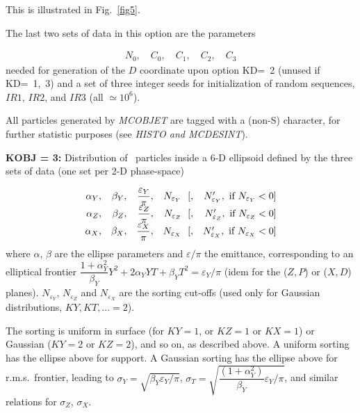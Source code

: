 \noindent This is illustrated in Fig.~\ref{fig5}.

\medskip

\noindent The last two sets of data in this option are the parameters 

 \begin{gather*}
	N_0,\quad C_0,\quad C_1,\quad C_2,\quad C_3 
 \end{gather*}
%
 needed for generation of the $ D $ coordinate upon option \mbox{KD=  2}  
(unused if \mbox{KD= 1, 3}) and a set of three integer seeds for initialization 
of random sequences, $ IR1$,   $ IR2$,   and $ IR3$ (all $\simeq 10^6 $).


\noindent All particles generated by \textsl{MCOBJET}  are tagged with
a (non-S) character, for further statistic purposes (see \textsl{HISTO \textrm{and}  
MCDESINT}).  

\medskip

\noindent\textbf{KOBJ  = 3:} Distribution of \IMAX\ particles inside a
6-D ellipsoid defined by the three sets of data (one set per 
 2-D phase-space)

$$
\begin{array}{*{4}{r<{,}}r}
 \alpha_ Y  &   \beta_ Y  
            &  \dfrac{ \varepsilon_Y}{\pi} 
            &  N_{\varepsilon_ Y}  ~~[
            & N'_{\varepsilon_ Y}, \text{ if } N_{\varepsilon_ Y} < 0] \\
\alpha_ Z   &  \beta_ Z  
            &  \dfrac{ \varepsilon_Z }{ \pi} 
            & N_{\varepsilon_ Z} ~~[
            & N'_{\varepsilon_ Z}, \text{ if } N_{\varepsilon_ Z} < 0] \\
\alpha_ X   & \beta_ X 
            &  \dfrac{\varepsilon_X }{ \pi} 
            & N_{\varepsilon_ X} ~~[
            & N'_{\varepsilon_ X}, \text{ if } N_{\varepsilon_ X} < 0] 
\end{array}           
$$            
%
where $\alpha$, $\beta$ are the ellipse parameters and $\varepsilon/ 
\pi$ the emittance, corresponding to an elliptical  frontier 
$\dfrac{1 + \alpha^2_Y}{\beta_Y} Y^2 + 2 \alpha_Y YT + \beta_Y T^2 = 
\varepsilon_Y / \pi$ (idem for the ($Z, P$) 
or ($X, D$) planes). $N_{\varepsilon_ Y}$, $N_{\varepsilon_ Z}$ and 
$N_{\varepsilon_ X}$ are the sorting cut-offs (used only for Gaussian 
distributions, $KY, KT, ...=2$).

\noindent The sorting is uniform in surface (for $KY=1$, or $KZ=1$ 
or $KX=1$) or Gaussian ($KY=2$ or $KZ=2$), and so on, as described 
above. A uniform sorting has the ellipse above for support. A 
Gaussian sorting has the ellipse above for r.m.s.~frontier, leading 
to $\sigma_Y = \sqrt {\beta_Y \varepsilon_Y / \pi}$, 
$\sigma_T = \sqrt {\dfrac{(1+\alpha_Y^2)}{\beta_Y} \varepsilon_Y / \pi}$, 
and similar relations for $\sigma_Z$, $\sigma_X$.

